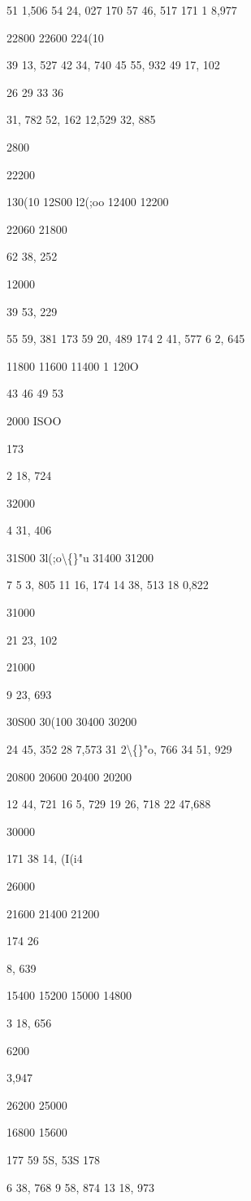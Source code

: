 \documentclass[10pt,a4paper]{article}
\begin{document}
51
1,506
54 24, 027
170 57 46, 517
171
1 8,977

22800
22600
224(10

39 13, 527
42 34, 740
45 55, 932
49 17, 102

26
29
33
36

31, 782
52, 162
12,529
32, 885

2800

22200

130(10
12S00
l2(;oo
12400
12200

22060
21800

62 38, 252

12000

39 53, 229

55 59, 381
173 59 20, 489
174
2 41, 577
6 2, 645

11800
11600
11400
1 120O

43
46
49
53

2000
ISOO

173

2 18, 724

32000

4 31, 406

31S00
3l(;o\textbackslash\{\}"u
31400
31200

7 5 3, 805
11 16, 174
14 38, 513
18 0,822

31000

21 23, 102

21000

9 23, 693

30S00
30(100
30400
30200

24 45, 352
28
7,573
31 2\textbackslash\{\}"o, 766
34 51, 929

20800
20600
20400
20200

12 44, 721
16 5, 729
19 26, 718
22 47,688

30000

171 38 14, (I(i4

26000

21600
21400
21200

174 26

8, 639

15400
15200
15000
14800

3 18, 656

6200

3,947

26200
25000

16800
15600

177 59 5S, 53S
178

6 38, 768
9 58, 874
13 18, 973
\end{document}
